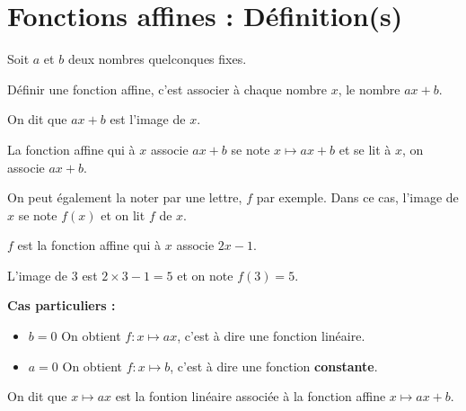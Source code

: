\section{Fonctions affines : Définition(s)}
\begin{definition}
    Soit $a$ et $b$ deux nombres quelconques \og{}fixes\fg{}.
    
    Définir une fonction affine, c'est associer à chaque nombre $x$, le nombre $ax+b$.
    
    On dit que $ax+b$ est l'image de $x$.
\end{definition}
\begin{definition}
    La fonction affine qui à $x$ associe $ax+b$ se note $x\mapsto ax+b$ et se lit \og{}à $x$, on associe $ax+b$\fg{}.
    
    On peut également la noter par une lettre, $f$ par exemple. Dans ce cas, l'image de $x$ se note $f(x)$ et on lit \og{}$f$ de $x$\fg{}.
\end{definition}
\begin{exemples*1}
    $f$ est la fonction affine qui à $x$ associe $2x-1$.
    
    L'image de 3 est $2\times3-1=5$ et on note $f(3)=5$.
    
    \textbf{Cas particuliers :}
    \begin{itemize}
        \item \underline{$b=0$} On obtient $f:x\mapsto ax$, c'est à dire une fonction linéaire.
        \item \underline{$a=0$} On obtient $f:x\mapsto b$, c'est à dire une fonction {\bf constante}.
    \end{itemize}
\end{exemples*1}
\begin{definition}
    On dit que $x\mapsto ax$ est la fontion linéaire associée à la fonction affine $x\mapsto ax+b$.
\end{definition}
